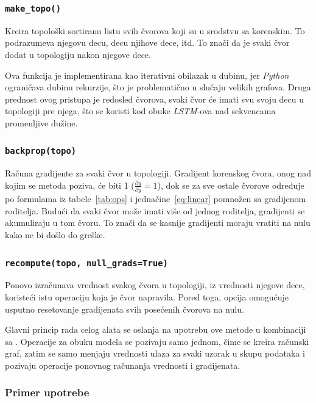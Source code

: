 \documentclass[11pt,a4paper]{article}
\newcommand{\code}[1]{\texttt{\detokenize{#1}}}
\begin{document}
\subsubsection{\texttt{make\_topo()}}

Kreira topološki sortiranu listu svih čvorova koji su u srodstvu sa korenskim.
To podrazumeva njegovu decu, decu njihove dece, itd. To znači da je svaki čvor
dodat u topologiju nakon njegove dece.

Ova funkcija je implementirana kao iterativni obilazak u dubinu, jer \textit{Python}
ograničava dubinu rekurzije, što je problematično u slučaju velikih grafova.
Druga prednost ovog pristupa je redosled čvorova, svaki čvor će imati svu svoju
decu u topologiji pre njega, što se koristi kod obuke \textit{LSTM}-ova
nad sekvencama promenljive dužine.

\subsubsection{\texttt{backprop(topo)}}

Računa gradijente za svaki čvor u topologiji. Gradijent korenskog čvora,
onog nad kojim se metoda poziva, će biti 1 ($\frac{\partial y}{\partial y}=1$),
dok se za sve ostale čvorove određuje po formulama iz tabele~\ref{tab:ops} i
jednačine~\ref{eq:linear} pomnožen sa gradijenom roditelja. Budući da svaki
čvor može imati više od jednog roditelja, gradijenti se akumuliraju u tom čvoru.
To znači da se kasnije gradijenti moraju vratiti na nulu kako ne bi došlo do
greške.

\subsubsection{\texttt{recompute(topo, null\_grads=True)}}

Ponovo izračunava vrednost svakog čvora u topologiji, iz vrednosti njegove
dece, koristeći istu operaciju koja je čvor napravila.
Pored toga, opcija \code{null_grads} omogućuje usputno resetovanje gradijenata
svih posećenih čvorova na nulu.

Glavni princip rada celog alata se oslanja na upotrebu ove metode u kombinaciji
sa \code{backprop}. Operacije za obuku modela se pozivaju samo jednom, čime se
kreira računski graf, zatim se samo menjaju vrednosti ulaza za svaki uzorak u
skupu podataka i pozivaju operacije ponovnog računanja vrednosti i gradijenata.

\subsubsection{Primer upotrebe}
\end{document}
